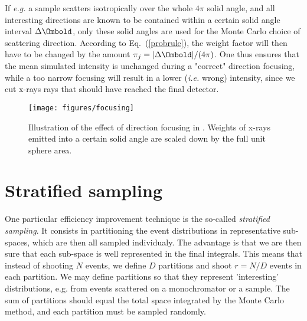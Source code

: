 If {\em e.g.} a sample scatters isotropically
over the whole $4\pi$ solid angle, and all interesting
directions are known to be contained within a certain
solid angle interval $\Delta \Ombold$, only these solid angles
are used for the Monte Carlo choice of scattering direction.
According to Eq.~(\ref{probrule}), the weight factor will then have
to be changed by the amount
$\pi_j = |\Delta \Ombold| / (4 \pi)$.
One thus ensures that the mean simulated intensity is unchanged
during a "correct" direction focusing, while a too narrow focusing will
result in a lower (\textit{i.e.} wrong) intensity, since
we cut x-rays rays that should have reached the final detector.

\begin{figure}[htb!]
\begin{center}
\texttt{[image: figures/focusing]}
\end{center}
\caption{Illustration of the effect of direction focusing in \MCX. Weights of x-rays emitted into a certain solid angle are
  scaled down by the full unit sphere area.}
\label{fig:focusing}
\end{figure}

\section{Stratified sampling}

One particular efficiency improvement technique is the so-called
\emph{stratified sampling}. It consists in partitioning the event distributions
in representative sub-spaces, which are then all sampled individualy. The
advantage is that we are then sure that each sub-space is well represented in
the final integrals. This means that instead of shooting $N$ events, we define
$D$ partitions and shoot $r=N/D$ events in each partition. We may define partitions so that they represent
'interesting' distributions, e.g. from events scattered on a monochromator or a
sample. The sum of partitions should equal the total space integrated by the
Monte Carlo method, and each partition must be sampled randomly.

